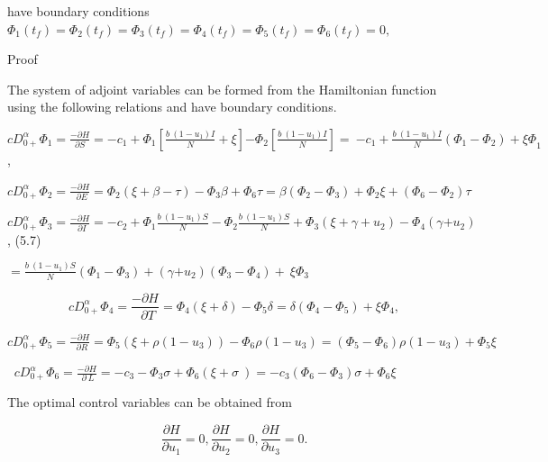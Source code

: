 \documentclass[10pt]{NSP1}
\begin{document}
have boundary conditions $\Phi_{1}\left( t_{f} \right) = \Phi_{2}\left( t_{f} \right) = \Phi_{3}\left( t_{f} \right) = \Phi_{4}\left( t_{f} \right) = \Phi_{5}\left( t_{f} \right) = \Phi_{6}\left( t_{f} \right) = 0,$

Proof

The system of adjoint variables can be formed from the Hamiltonian function using the following relations and have boundary conditions.

${cD}_{0 +}^{\alpha}\Phi_{1} = \frac{- \partial H}{\partial S} = {- c}_{1} + \Phi_{1}\left\lbrack \frac{b\ \left( 1 - u_{1} \right)I}{N} + \xi \right\rbrack{- \Phi}_{2}\left\lbrack \frac{b\ \left( 1 - u_{1} \right)I}{N} \right\rbrack = \ {- c}_{1} + \frac{b\ \left( 1 - u_{1} \right)I}{N}\left( \Phi_{1} - \Phi_{2} \right) + {\xi\Phi}_{1}$,

${cD}_{0 +}^{\alpha}\Phi_{2} = \frac{- \partial H}{\ \ \partial E} = \Phi_{2}(\xi + \beta - \tau) - \Phi_{3}\beta + \Phi_{6}\tau = \beta\left( \Phi_{2} - \Phi_{3} \right) + \Phi_{2}\xi + (\Phi_{6} - \Phi_{2})\tau$

${cD}_{0 +}^{\alpha}\Phi_{3} = \frac{- \partial H}{\ \ \partial I} = - c_{2} + \Phi_{1}\frac{b\ \left( 1 - u_{1} \right)S}{N} - \Phi_{2}\frac{b\ \left( 1 - u_{1} \right)S}{N} + \Phi_{3}\left( \xi + \gamma + u_{2} \right) - \Phi_{4}(\gamma{+ u}_{2})$, (5.7)

$= \frac{b\ \left( 1 - u_{1} \right)S}{N}\left( \Phi_{1} - \Phi_{3} \right) + (\gamma{+ u}_{2})\left( \Phi_{3} - \Phi_{4} \right) + \ \xi\Phi_{3}\ $

\begin{equation}
{cD}_{0 +}^{\alpha}\Phi_{4} = \frac{- \partial H}{\ \ \partial T} = \Phi_{4}(\xi + \delta) - \Phi_{5}\delta = \delta\left( \Phi_{4} - \Phi_{5} \right) + \xi\Phi_{4},

\end{equation}

${cD}_{0 +}^{\alpha}\Phi_{5} = \frac{- \partial H}{\ \ \partial R} = \Phi_{5}\left( \xi + \rho\left( 1 - u_{3} \right) \right) - \Phi_{6}\rho\left( 1 - u_{3} \right) = \left( \Phi_{5} - \Phi_{6} \right)\rho\left( 1 - u_{3} \right) + \Phi_{5}\xi$

$\ $ ${cD}_{0 +}^{\alpha}\Phi_{6} = \frac{- \partial H}{\ \ \partial\ L\ } = - c_{3} - \Phi_{3}\sigma + \Phi_{6}(\xi + \sigma\ ) = - c_{3}\left( \Phi_{6} - \Phi_{3} \right)\sigma + \Phi_{6}\xi$

The optimal control variables can be obtained from

\begin{equation}
\frac{\partial H}{\partial u_{1}} = 0,\frac{\partial H}{\partial u_{2}} = 0,\frac{\partial H}{\partial u_{3}} = 0.

\end{equation}
\end{document}
